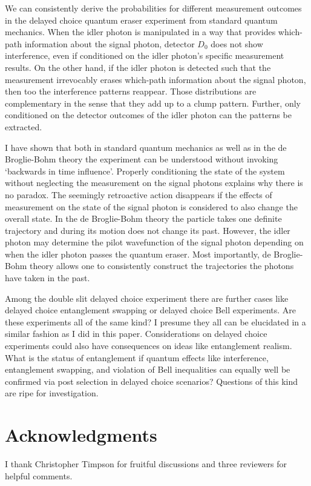 \documentclass[12pt]{article}
\numberwithin{equation}{section}
\begin{document}
We can consistently derive the probabilities for different measurement outcomes in the delayed choice quantum eraser experiment from standard quantum mechanics. When the idler photon is manipulated in a way that provides which-path information about the signal photon, detector $D_0$ does not show interference, even if conditioned on the idler photon's specific measurement results. On the other hand, if the idler photon is detected such that the measurement irrevocably erases  which-path information about the signal photon, then too the interference patterns reappear. Those distributions are complementary in the sense that they add up to a clump pattern. Further, only conditioned on the detector outcomes of the idler photon can the patterns be extracted.

I have shown that both in standard quantum mechanics as well as in the de Broglie-Bohm theory the experiment can be understood without invoking `backwards in time influence'. Properly conditioning the state of the system without neglecting the measurement on the signal photons explains why there is no paradox. The seemingly retroactive action disappears if the effects of measurement on the state of the signal photon is considered to also change the overall state. In the de Broglie-Bohm theory the particle takes one definite trajectory and during its motion does not change its past. However, the idler photon may determine the pilot wavefunction of the signal photon depending on when the idler photon passes the quantum eraser. Most importantly, de Broglie-Bohm theory allows one to consistently construct the trajectories the photons have taken in the past. 

Among the double slit delayed choice experiment there are further cases like delayed choice entanglement swapping or delayed choice Bell experiments. Are these experiments all of the same kind? I presume they all can be elucidated in a similar fashion as I did in this paper. Considerations on delayed choice experiments could also have consequences on ideas like entanglement realism. What is the status of entanglement if quantum effects like interference, entanglement swapping, and violation of Bell inequalities can equally well be confirmed via post selection in delayed choice scenarios? Questions of this kind are ripe for investigation. 

\section*{Acknowledgments}

I thank Christopher Timpson for fruitful discussions and three reviewers for helpful comments.



\end{document}
